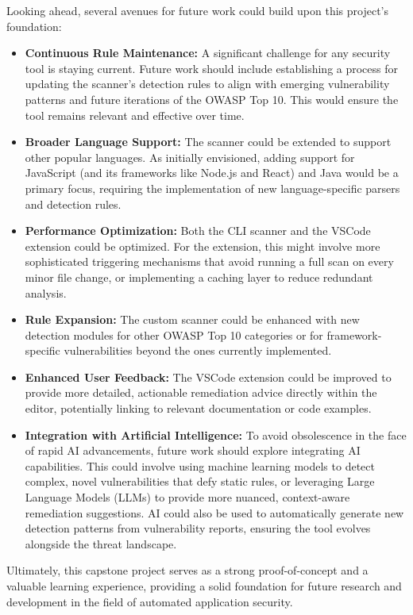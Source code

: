 Looking ahead, several avenues for future work could build upon this project's foundation:

\begin{itemize}
    \item \textbf{Continuous Rule Maintenance:} A significant challenge for any security tool is staying current. Future work should include establishing a process for updating the scanner's detection rules to align with emerging vulnerability patterns and future iterations of the OWASP Top 10. This would ensure the tool remains relevant and effective over time.
    \item \textbf{Broader Language Support:} The scanner could be extended to support other popular languages. As initially envisioned, adding support for JavaScript (and its frameworks like Node.js and React) and Java would be a primary focus, requiring the implementation of new language-specific parsers and detection rules.
    \item \textbf{Performance Optimization:} Both the CLI scanner and the VSCode extension could be optimized. For the extension, this might involve more sophisticated triggering mechanisms that avoid running a full scan on every minor file change, or implementing a caching layer to reduce redundant analysis.
    \item \textbf{Rule Expansion:} The custom scanner could be enhanced with new detection modules for other OWASP Top 10 categories or for framework-specific vulnerabilities beyond the ones currently implemented.
    \item \textbf{Enhanced User Feedback:} The VSCode extension could be improved to provide more detailed, actionable remediation advice directly within the editor, potentially linking to relevant documentation or code examples.
    \item \textbf{Integration with Artificial Intelligence:} To avoid obsolescence in the face of rapid AI advancements, future work should explore integrating AI capabilities. This could involve using machine learning models to detect complex, novel vulnerabilities that defy static rules, or leveraging Large Language Models (LLMs) to provide more nuanced, context-aware remediation suggestions. AI could also be used to automatically generate new detection patterns from vulnerability reports, ensuring the tool evolves alongside the threat landscape.
\end{itemize}

Ultimately, this capstone project serves as a strong proof-of-concept and a valuable learning experience, providing a solid foundation for future research and development in the field of automated application security.
